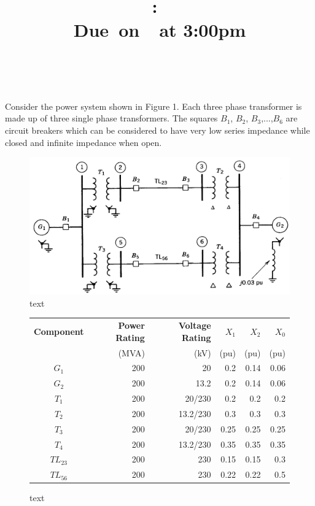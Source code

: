 \documentclass{article}
\title{
    \vspace{2in}
    \textmd{\textbf{\hmwkClass:\ \hmwkTitle}}\\
    \normalsize\vspace{0.1in}\small{Due\ on\ \hmwkDueDate\ at 3:00pm}\\
    \vspace{0.1in}\large{\textit{\hmwkClassInstructor\ \hmwkClassTime}}
    \vspace{3in}
}
\author{\textbf{\hmwkAuthorName}}
\date{}
\begin{document}
\maketitle

\pagebreak

Consider the power system shown in Figure 1. Each three phase transformer is made up of three single phase transformers. The squares $B_1$, $B_2$, $B_3$,...,$B_6$ are circuit breakers which can be considered to have very low series impedance while closed and infinite impedance when open.

\begin{figure}[H]
	\centering
	\includegraphics[scale=0.3]{fig1}
	\caption{text}
\end{figure}

\begin{figure}[H]
	\centering
	\caption{text}
	\begin{tabular}{crrrrr}
		\toprule
		\textbf{Component}	&	\textbf{Power Rating}	&	\textbf{Voltage Rating}	&	$X_1$	& 	$X_2$	&	$X_0$\\
					&	(MVA)			&	(kV)			&	(pu)	&	(pu)	&	(pu)\\
		\midrule
		$G_1$		&	200				&	20				&	0.2		&	0.14	&	0.06\\
		$G_2$		&	200				&	13.2			&	0.2		&	0.14	&	0.06\\
		$T_1$		&	200				&	20/230			&	0.2		&	0.2		&	0.2\\
		$T_2$		&	200				&	13.2/230		&	0.3		&	0.3		&	0.3\\
		$T_3$		&	200				&	20/230			&	0.25	&	0.25	&	0.25\\
		$T_4$		&	200				&	13.2/230		&	0.35	&	0.35	&	0.35\\
		$TL_{23}$	&	200				&	230				&	0.15	&	0.15	&	0.3\\
		$TL_{56}$	&	200				&	230				&	0.22	&	0.22	&	0.5\\
		\bottomrule	
	\end{tabular}
\end{figure}
\end{document}
